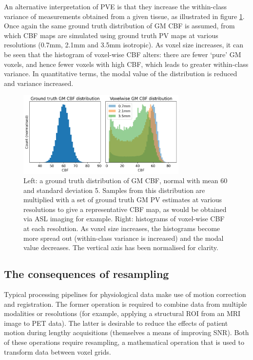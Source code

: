 \documentclass[12pt]{report}
\begin{document}
An alternative interpretation of PVE is that they increase the within-class variance of measurements obtained from a given tissue, as illustrated in figure \ref{CBF_PVE_hist_simple}. Once again the same ground truth distribution of GM CBF is assumed, from which CBF maps are simulated using ground truth PV maps at various resolutions (0.7mm, 2.1mm and 3.5mm isotropic). As voxel size increases, it can be seen that the histogram of voxel-wise CBF alters: there are fewer `pure' GM voxels, and hence fewer voxels with high CBF, which leads to greater within-class variance. In quantitative terms, the modal value of the distribution is reduced and variance increased. 

\begin{figure}
\centering
\includegraphics[width = 0.75\textwidth]{CBF_PVE_hists.png}
\caption{Left: a ground truth distribution of GM CBF, normal with mean 60 and standard deviation 5. Samples from this distribution are multiplied with a set of ground truth GM PV estimates at various resolutions to give a representative CBF map, as would be obtained via ASL imaging for example. Right: histograms of voxel-wise CBF at each resolution. As voxel size increases, the histograms become more spread out (within-class variance is increased) and the modal value decreases. The vertical axis has been normalised for clarity.}
\label{CBF_PVE_hist_simple}
\end{figure}

\subsection{The consequences of resampling}

Typical processing pipelines for physiological data make use of motion correction and registration. The former operation is required to combine data from multiple modalities or resolutions (for example, applying a structural ROI from an MRI image to PET data). The latter is desirable to reduce the effects of patient motion during lengthy acquisitions (themselves a means of improving SNR). Both of these operations require resampling, a mathematical operation that is used to transform data between voxel grids.  
\end{document}
